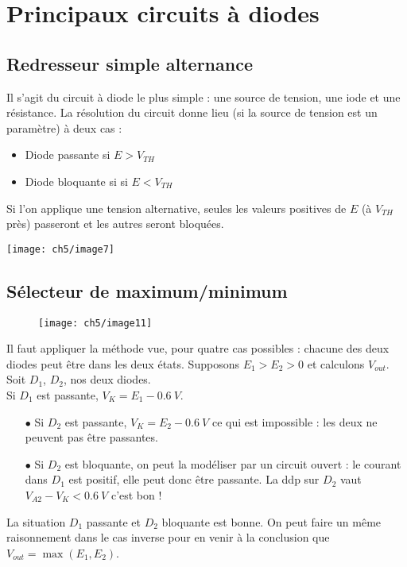 		\newpage
		
	\section{Principaux circuits à diodes}
		\subsection{Redresseur simple alternance}
		Il s'agit du circuit à diode le plus simple : une source de tension, une iode 
		et une résistance. La résolution du circuit donne lieu (si la source de tension 
		est un paramètre) à deux cas :
		\begin{itemize}
		\item Diode passante si $E > V_{TH}$
		\item Diode bloquante si si $E < V_{TH}$
		\end{itemize}
		Si l'on applique une tension alternative, seules les valeurs positives de $E$ 
		(à $V_{TH}$ près) passeront et les autres seront bloquées.
		\begin{center}
		\texttt{[image: ch5/image7]}
		\end{center}
		
		\subsection{Sélecteur de maximum/minimum}
		\begin{wrapfigure}[8]{r}{3cm}
		\vspace{-0.5cm}
		\texttt{[image: ch5/image11]}
		\end{wrapfigure}
		Il faut appliquer la méthode vue, pour quatre cas possibles : chacune des 
		deux diodes peut être dans les deux états. Supposons $E_1>E_2>0$ et 
		calculons $V_{out}$. Soit $D_1$, $D_2$, nos deux diodes.\\
		Si $D_1$ est passante, $V_K = E_1-0.6\ V$.
		\begin{itemize}
		\item[$\bullet$] Si $D_2$ est passante, $V_K = E_2-0.6\ V$ ce qui est 
		impossible : les deux ne peuvent pas être passantes.
		\item[$\bullet$] Si $D_2$ est bloquante, on peut la modéliser par un 
		circuit ouvert : le courant dans $D_1$ est positif, elle peut donc être 
		passante. La ddp sur $D_2$ vaut $V_{A2}-V_K < 0.6\ V$ c'est bon !
		\end{itemize}
		La situation $D_1$ passante et $D_2$ bloquante est bonne. On peut faire 
		un même raisonnement dans le cas inverse pour en venir à la conclusion 
		que $V_{out} = \max(E_1,E_2)$.
		
